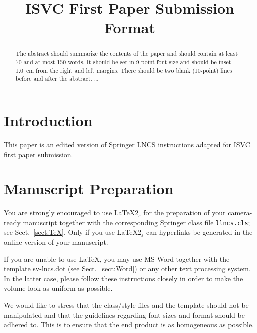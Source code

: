 \documentclass[runningheads]{llncs}
\begin{document}
\pagestyle{headings}

\mainmatter

\title{ISVC First Paper Submission Format}


\maketitle

\begin{abstract}
The abstract should summarize the contents of the paper and should
contain at least 70 and at most 150 words. It should be set in 9-point
font size and should be inset 1.0~cm from the right and left margins.
There should be two blank (10-point) lines before and after the
abstract.
\dots
\end{abstract}


\section{Introduction}
This paper is an edited version of Springer LNCS instructions adapted for
ISVC first paper submission.

\section{Manuscript Preparation}

You are strongly encouraged to use \LaTeX2$_\varepsilon$ for the
preparation of your
camera-ready manuscript together with the corresponding Springer
class file \verb+llncs.cls+;
see Sect.~\ref{sect:TeX}. Only if you use \LaTeX2$_\varepsilon$ can
hyperlinks be generated in the online version of your manuscript.

If you are unable to use \LaTeX, you may use MS Word together with the
template sv-lncs.dot (see Sect.~\ref{sect:Word}) or any other text
processing system. In the latter case, please follow
these instructions closely in order to make the volume
look as uniform as possible.

We would like to stress that the class/style files and the template
should not be manipulated and that the guidelines regarding font sizes
and format should be adhered to. This is to ensure that the end product
is as homogeneous as possible.
\end{document}
